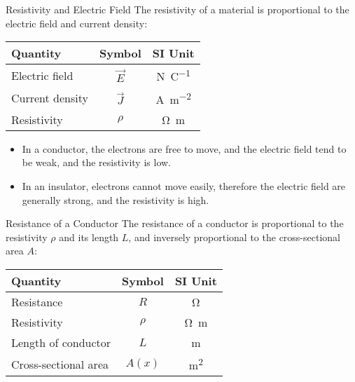 \documentclass[12pt,aspectratio=169]{beamer}
\begin{document}
\begin{frame}{Resistivity and Electric Field}
  The resistivity of a material is proportional to the electric field and
  current density:

  \begin{center}
    \begin{tabular}{l|c|c}
      \rowcolor{pink}
      \textbf{Quantity} & \textbf{Symbol} & \textbf{SI Unit} \\ \hline
      Electric field & $\vec E$ & \si{\newton\per\coulomb} \\
      Current density & $\vec J$ & \si{\ampere\per\metre\squared} \\
      Resistivity & $\rho$ & \si{\ohm\metre}
    \end{tabular}
  \end{center}
  \begin{itemize}
  \item In a conductor, the electrons are free to move, and the electric
    field tend to be weak, and the resistivity is low.
  \item In an insulator, electrons cannot move easily, therefore the electric
    field are generally strong, and the resistivity is high.
  \end{itemize}
\end{frame}



\begin{frame}{Resistance of a Conductor}
  The resistance of a conductor is proportional to the resistivity $\rho$ and
  its length $L$, and inversely proportional to the cross-sectional area $A$:

  \begin{center}
    \begin{tabular}{l|c|c}
      \rowcolor{pink}
      \textbf{Quantity} & \textbf{Symbol} & \textbf{SI Unit} \\ \hline
      Resistance           & $R$    & \si\ohm \\
      Resistivity          & $\rho$ & \si{\ohm\metre} \\
      Length of conductor  & $L$    & \si\metre \\
      Cross-sectional area & $A(x)$ & \si{\metre\squared}
    \end{tabular}
  \end{center}
\end{frame}
\end{document}
